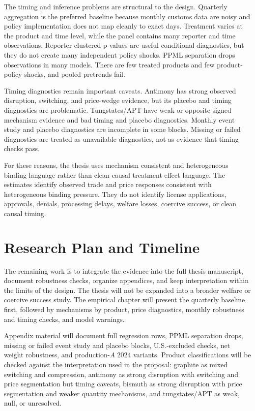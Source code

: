 \documentclass[12pt,a4paper]{article}
\numberwithin{equation}{section}
\begin{document}
The timing and inference problems are structural to the design. Quarterly aggregation is the preferred baseline because monthly customs data are noisy and policy implementation does not map cleanly to exact days. Treatment varies at the product and time level, while the panel contains many reporter and time observations. Reporter clustered p values are useful conditional diagnostics, but they do not create many independent policy shocks. PPML separation drops observations in many models. There are few treated products and few product-policy shocks, and pooled pretrends fail.

Timing diagnostics remain important caveats. Antimony has strong observed disruption, switching, and price-wedge evidence, but its placebo and timing diagnostics are problematic. Tungstates/APT have weak or opposite signed mechanism evidence and bad timing and placebo diagnostics. Monthly event study and placebo diagnostics are incomplete in some blocks. Missing or failed diagnostics are treated as unavailable diagnostics, not as evidence that timing checks pass.

For these reasons, the thesis uses mechanism consistent and heterogeneous binding language rather than clean causal treatment effect language. The estimates identify observed trade and price responses consistent with heterogeneous binding pressure. They do not identify license applications, approvals, denials, processing delays, welfare losses, coercive success, or clean causal timing.

\section{Research Plan and Timeline}

The remaining work is to integrate the evidence into the full thesis manuscript, document robustness checks, organize appendices, and keep interpretation within the limits of the design. The thesis will not be expanded into a broader welfare or coercive success study. The empirical chapter will present the quarterly baseline first, followed by mechanisms by product, price diagnostics, monthly robustness and timing checks, and model warnings.

Appendix material will document full regression rows, PPML separation drops, missing or failed event study and placebo blocks, U.S.-excluded checks, net weight robustness, and production-\(A\) 2024 variants. Product classifications will be checked against the interpretation used in the proposal: graphite as mixed switching and compression, antimony as strong disruption with switching and price segmentation but timing caveats, bismuth as strong disruption with price segmentation and weaker quantity mechanisms, and tungstates/APT as weak, null, or unresolved.
\end{document}
